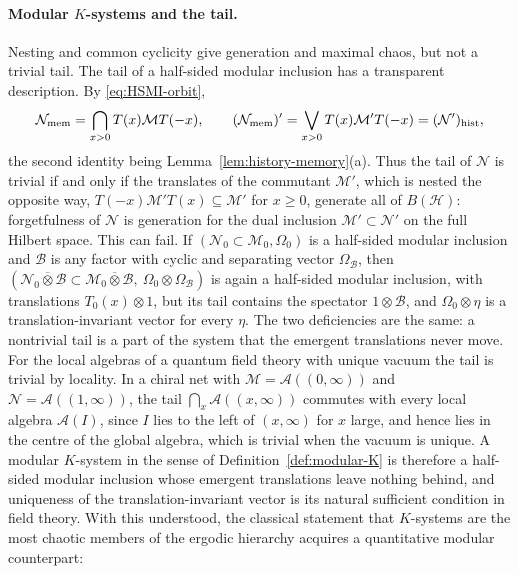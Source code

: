 \documentclass[a4paper,11pt]{article}
\theoremstyle{definition}
\begin{document}
\paragraph{Modular $K$-systems and the tail.}
Nesting and common cyclicity give generation and maximal chaos, but not a trivial tail. The tail of a half-sided modular inclusion has a transparent description. By \eqref{eq:HSMI-orbit},
\begin{equation}
 \mathcal N_{\rm mem}=\bigcap_{x>0}T(x)\mathcal MT(-x),
 \qquad
 (\mathcal N_{\rm mem})'=\bigvee_{x>0}T(x)\mathcal M'T(-x)=(\mathcal N')_{\rm hist},
 \label{eq:HSMI-tail}
\end{equation}
the second identity being Lemma~\ref{lem:history-memory}(a). Thus the tail of $\mathcal N$ is trivial if and only if the translates of the commutant $\mathcal M'$, which is nested the opposite way, $T(-x)\mathcal M'T(x)\subseteq\mathcal M'$ for $x\ge0$, generate all of $B(\mathcal H)$: forgetfulness of $\mathcal N$ is generation for the dual inclusion $\mathcal M'\subset\mathcal N'$ on the full Hilbert space. This can fail. If $(\mathcal N_0\subset\mathcal M_0,\Omega_0)$ is a half-sided modular inclusion and $\mathcal B$ is any factor with cyclic and separating vector $\Omega_{\mathcal B}$, then $(\mathcal N_0\overline\otimes\mathcal B\subset\mathcal M_0\overline\otimes\mathcal B,\ \Omega_0\otimes\Omega_{\mathcal B})$ is again a half-sided modular inclusion, with translations $T_0(x)\otimes1$, but its tail contains the spectator $1\otimes\mathcal B$, and $\Omega_0\otimes\eta$ is a translation-invariant vector for every $\eta$. The two deficiencies are the same: a nontrivial tail is a part of the system that the emergent translations never move. For the local algebras of a quantum field theory with unique vacuum the tail is trivial by locality. In a chiral net with $\mathcal M=\mathcal A((0,\infty))$ and $\mathcal N=\mathcal A((1,\infty))$, the tail $\bigcap_{x}\mathcal A((x,\infty))$ commutes with every local algebra $\mathcal A(I)$, since $I$ lies to the left of $(x,\infty)$ for $x$ large, and hence lies in the centre of the global algebra, which is trivial when the vacuum is unique. A modular $K$-system in the sense of Definition~\ref{def:modular-K} is therefore a half-sided modular inclusion whose emergent translations leave nothing behind, and uniqueness of the translation-invariant vector is its natural sufficient condition in field theory. With this understood, the classical statement that $K$-systems are the most chaotic members of the ergodic hierarchy acquires a quantitative modular counterpart:
\end{document}
